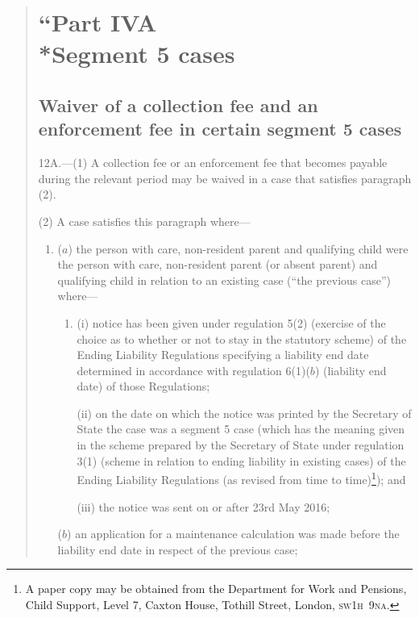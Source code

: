 \documentclass[12pt,a4paper]{article}
\begin{document}
\begin{quotation}
    \section*{``Part IVA\\*Segment 5 cases}
    \subsection*{Waiver of a collection fee and an enforcement fee in certain segment 5 cases}

12A.---(1)
    A collection fee or an enforcement fee that becomes payable during the relevant period may be waived in a case that satisfies paragraph (2).

    (2)
    A case satisfies this paragraph where—
\begin{enumerate}\item[]
    ($a$)
    the person with care, non-resident parent and qualifying child were the person with care, non-resident parent (or absent parent) and qualifying child in relation to an existing case (“the previous case”) where—
\begin{enumerate}\item[]
    (i)
    notice has been given under regulation 5(2) (exercise of the choice as to whether or not to stay in the statutory scheme) of the Ending Liability Regulations specifying a liability end date determined in accordance with regulation 6(1)($b$) (liability end date) of those Regulations;

    (ii)
    on the date on which the notice was printed by the Secretary of State the case was a segment 5 case (which has the meaning given in the scheme prepared by the Secretary of State under regulation 3(1) (scheme in relation to ending liability in existing cases) of the Ending Liability Regulations (as revised from time to time)\footnote{ A paper copy may be obtained from the Department for Work and Pensions, Child Support, Level 7, Caxton House, Tothill Street, London, \textsc{\lowercase{SW1H~9NA}}.}); and
    
(iii)
    the notice was sent on or after 23rd May 2016;
\end{enumerate}

    ($b$)
    an application for a maintenance calculation was made before the liability end date in respect of the previous case;


\end{enumerate}
\end{quotation}
\end{document}
